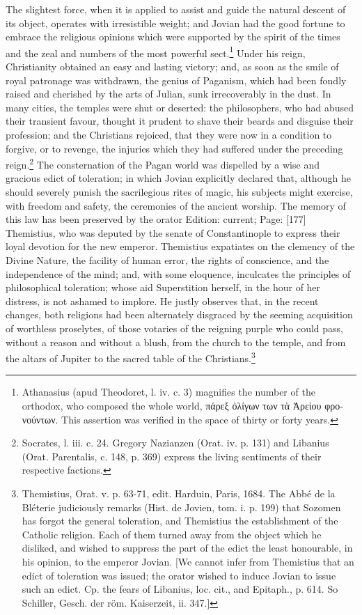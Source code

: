 The slightest force, when it is applied to assist and guide the natural descent of its object, operates with irresistible weight; and Jovian had the good fortune to embrace the religious opinions which were supported by the spirit of the times and the zeal and numbers of the most powerful sect.\footnote{Athanasius (apud Theodoret, l. iv. c. 3) magnifies the number of the orthodox, who composed the whole world, \textgreek{πάρεξ \texthebrew{ὀ}λίγων των τ\texthebrew{ὰ Ἀ}ρείου φρονούντων}. This assertion was verified in the space of thirty or forty years.} Under his reign, Christianity obtained an easy and lasting victory; and, as soon as the smile of royal patronage was withdrawn, the genius of Paganism, which had been fondly raised and cherished by the arts of Julian, sunk irrecoverably in the dust. In many cities, the temples were shut or deserted: the philosophers, who had abused their transient favour, thought it prudent to shave their beards and disguise their profession; and the Christians rejoiced, that they were now in a condition to forgive, or to revenge, the injuries which they had suffered under the preceding reign.\footnote{Socrates, l. iii. c. 24. Gregory Nazianzen (Orat. iv. p. 131) and Libanius (Orat. Parentalis, c. 148, p. 369) express the living sentiments of their respective factions.} The consternation of the Pagan world was dispelled by a wise and gracious edict of toleration; in which Jovian explicitly declared that, although he should severely punish the sacrilegious rites of magic, his subjects might exercise, with freedom and safety, the ceremonies of the ancient worship. The memory of this law has been preserved by the orator Edition: current; Page: [177] Themistius, who was deputed by the senate of Constantinople to express their loyal devotion for the new emperor. Themistius expatiates on the clemency of the Divine Nature, the facility of human error, the rights of conscience, and the independence of the mind; and, with some eloquence, inculcates the principles of philosophical toleration; whose aid Superstition herself, in the hour of her distress, is not ashamed to implore. He justly observes that, in the recent changes, both religions had been alternately disgraced by the seeming acquisition of worthless proselytes, of those votaries of the reigning purple who could pass, without a reason and without a blush, from the church to the temple, and from the altars of Jupiter to the sacred table of the Christians.\footnote{Themistius, Orat. v. p. 63-71, edit. Harduin, Paris, 1684. The Abbé de la Bléterie judiciously remarks (Hist. de Jovien, tom. i. p. 199) that Sozomen has forgot the general toleration, and Themistius the establishment of the Catholic religion. Each of them turned away from the object which he disliked, and wished to suppress the part of the edict the least honourable, in his opinion, to the emperor Jovian. [We cannot infer from Themistius that an edict of toleration was issued; the orator wished to induce Jovian to issue such an edict. Cp. the fears of Libanius, loc. cit., and Epitaph., p. 614. So Schiller, Gesch. der röm. Kaiserzeit, ii. 347.]}

